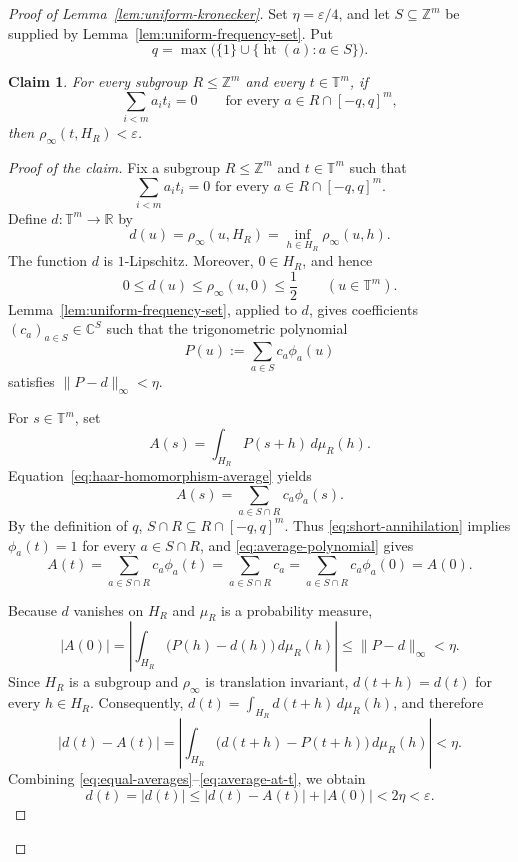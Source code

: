 \documentclass[10pt,a4paper]{amsart}
\newtheorem*{claim}{Claim}
\newcommand{\T}{\mathbb T}
\newcommand{\Z}{\mathbb Z}
\newcommand{\htop}{\operatorname{ht}}
\begin{document}
\begin{proof}[Proof of Lemma~\ref{lem:uniform-kronecker}]
Set $\eta=\varepsilon/4$, and let $S\subseteq\Z^m$ be supplied by
Lemma~\ref{lem:uniform-frequency-set}.
Put
\[
 q=\max\bigl(\{1\}\cup\{\htop(a):a\in S\}\bigr).
\]

\begin{claim}
For every subgroup $R\leq\Z^m$ and every
$t\in\T^m$, if
\[
 \sum_{i<m}a_i t_i=0
 \qquad\text{for every }a\in R\cap[-q,q]^m,
\]
then $\rho_\infty(t,H_R)<\varepsilon$.
\end{claim}

\begin{proof}[Proof of the claim]
Fix a subgroup $R\leq\Z^m$ and $t\in\T^m$ such that
\begin{equation}\label{eq:short-annihilation}
 \sum_{i<m}a_i t_i=0\text{ for every }a\in R\cap[-q,q]^m.
\end{equation}
Define $d:\T^m\to\mathbb R$ by
\[
 d(u)=\rho_\infty(u,H_R)=\inf_{h\in H_R}\rho_\infty(u,h).
\]
The function $d$ is $1$-Lipschitz.
Moreover, $0\in H_R$, and hence
\[
 0\leq d(u)\leq\rho_\infty(u,0)\leq\frac12
 \qquad(u\in\T^m).
\]
Lemma~\ref{lem:uniform-frequency-set}, applied to $d$, gives coefficients
$(c_a)_{a\in S}\in\mathbb C^S$ such that the trigonometric polynomial
\[
 P(u):=\sum_{a\in S}c_a\phi_a(u)
\]
satisfies $\|P-d\|_\infty<\eta$.

For $s\in\T^m$, set
\[
 A(s)=\int_{H_R}P(s+h)\,d\mu_R(h).
\]
Equation~\eqref{eq:haar-homomorphism-average} yields
\begin{equation}\label{eq:average-polynomial}
 A(s)=\sum_{a\in S\cap R}c_{a}\phi_a(s).
\end{equation}
By the definition of $q$,
$S\cap R\subseteq R\cap[-q,q]^m$.  Thus
\eqref{eq:short-annihilation} implies $\phi_a(t)=1$ for every
$a\in S\cap R$, and \eqref{eq:average-polynomial} gives
\begin{equation}\label{eq:equal-averages}
 A(t)=\sum_{a\in S\cap R}c_a\phi_a(t)
     =\sum_{a\in S\cap R}c_a
     =\sum_{a\in S\cap R}c_a\phi_a(0)=A(0).
\end{equation}

Because $d$ vanishes on $H_R$ and $\mu_R$ is a probability measure,
\begin{equation}\label{eq:average-at-zero}
 |A(0)|
 =\left|\int_{H_R}\bigl(P(h)-d(h)\bigr)\,d\mu_R(h)\right|\leq\|P-d\|_\infty<\eta.
\end{equation}
Since $H_R$ is a subgroup and $\rho_\infty$ is translation invariant,
$d(t+h)=d(t)$ for every $h\in H_R$.  Consequently,
$d(t)=\int_{H_R}d(t+h)\,d\mu_R(h)$, and therefore
\begin{equation}\label{eq:average-at-t}
 |d(t)-A(t)|
 =\left|\int_{H_R}\bigl(d(t+h)-P(t+h)\bigr)\,d\mu_R(h)\right|
 <\eta.
\end{equation}
Combining \eqref{eq:equal-averages}--\eqref{eq:average-at-t}, we obtain
\[
 d(t)=|d(t)|
 \leq |d(t)-A(t)|+|A(0)|
 <2\eta<\varepsilon.
\]
\end{proof}


\end{proof}
\end{document}
